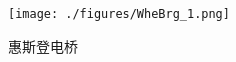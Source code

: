 

\begin{figure}[ht]
\centering
\texttt{[image: ./figures/WheBrg\_1.png]}
\caption{惠斯登电桥} \label{WheBrg_fig1}
\end{figure}
